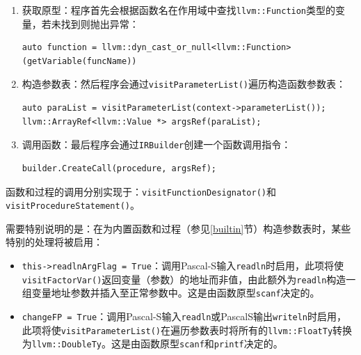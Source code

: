 \documentclass[lang=cn,11pt,a4paper,cite=authornum]{paper}
\begin{document}
\begin{enumerate}
    \item 获取原型：程序首先会根据函数名在作用域中查找\texttt{llvm::Function}类型的变量，若未找到则抛出异常：
    \begin{code}
    \begin{verbatim}
auto function = llvm::dyn_cast_or_null<llvm::Function>(getVariable(funcName))
    \end{verbatim}
    \end{code}
    \item 构造参数表：然后程序会通过\texttt{visitParameterList()}遍历构造函数参数表：
    \begin{code}
    \begin{verbatim}
auto paraList = visitParameterList(context->parameterList());
llvm::ArrayRef<llvm::Value *> argsRef(paraList);
    \end{verbatim}
    \end{code}
    \item 调用函数：最后程序会通过\texttt{IRBuilder}创建一个函数调用指令：
    \begin{code}
    \begin{verbatim}
builder.CreateCall(procedure, argsRef);
    \end{verbatim}
    \end{code}
\end{enumerate}

函数和过程的调用分别实现于：\texttt{visitFunctionDesignator()}和\texttt{visitProcedureStatement()}。

需要特别说明的是：在为内置函数和过程（参见\ref{builtin}节）构造参数表时，某些特别的处理将被启用：

\begin{itemize}
    \item \texttt{this->readlnArgFlag = True}：调用Pascal-S输入\texttt{readln}时启用，此项将使\texttt{visitFactorVar()}返回变量（参数）的地址而非值，由此额外为\texttt{readln}构造一组变量地址参数并插入至正常参数中。这是由函数原型\texttt{scanf}决定的。
    \item \texttt{changeFP = True}：调用Pascal-S输入\texttt{readln}或PascalS输出\texttt{writeln}时启用，此项将使\texttt{visitParameterList()}在遍历参数表时将所有的\texttt{llvm::FloatTy}转换为\texttt{llvm::DoubleTy}。这是由函数原型\texttt{scanf}和\texttt{printf}决定的。
\end{itemize}
\end{document}
